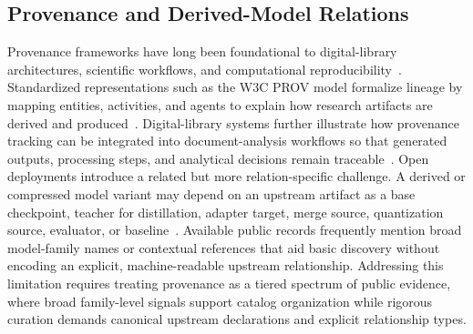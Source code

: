 \subsection{Provenance and Derived-Model Relations}
Provenance frameworks have long been foundational to digital-library architectures, scientific workflows, and computational reproducibility~\cite{moreau2013prov,davidson2008provenance,herschel2017survey}.
Standardized representations such as the W3C PROV model formalize lineage by mapping entities, activities, and agents to explain how research artifacts are derived and produced~\cite{moreau2013prov}.
Digital-library systems further illustrate how provenance tracking can be integrated into document-analysis workflows so that generated outputs, processing steps, and analytical decisions remain traceable~\cite{rauch2025ontextract}.
Open \llm deployments introduce a related but more relation-specific challenge.
A derived or compressed model variant may depend on an upstream artifact as a base checkpoint, teacher for distillation, adapter target, merge source, quantization source, evaluator, or baseline~\cite{jiang2023ptmreuse,taraghi2024modelreuse,white2024mof}.
Available public records frequently mention broad model-family names or contextual references that aid basic discovery without encoding an explicit, machine-readable upstream relationship.
Addressing this limitation requires treating provenance as a tiered spectrum of public evidence, where broad family-level signals support catalog organization while rigorous curation demands canonical upstream declarations and explicit relationship types.

